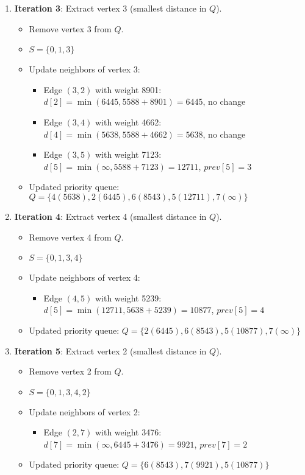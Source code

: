 \documentclass{article}
\theoremstyle{definition}
\begin{document}
\begin{enumerate}
\item \textbf{Iteration 3}: Extract vertex 3 (smallest distance in $Q$).
   \begin{itemize}
   \item Remove vertex 3 from $Q$.
   \item $S = \{0, 1, 3\}$
   \item Update neighbors of vertex 3:
     \begin{itemize}
     \item Edge $(3,2)$ with weight 8901: $d[2] = \min(6445, 5588 + 8901) = 6445$, no change
     \item Edge $(3,4)$ with weight 4662: $d[4] = \min(5638, 5588 + 4662) = 5638$, no change
     \item Edge $(3,5)$ with weight 7123: $d[5] = \min(\infty, 5588 + 7123) = 12711$, $prev[5] = 3$
     \end{itemize}
   \item Updated priority queue: $Q = \{4(5638), 2(6445), 6(8543), 5(12711), 7(\infty)\}$
   \end{itemize}

\item \textbf{Iteration 4}: Extract vertex 4 (smallest distance in $Q$).
   \begin{itemize}
   \item Remove vertex 4 from $Q$.
   \item $S = \{0, 1, 3, 4\}$
   \item Update neighbors of vertex 4:
     \begin{itemize}
     \item Edge $(4,5)$ with weight 5239: $d[5] = \min(12711, 5638 + 5239) = 10877$, $prev[5] = 4$
     \end{itemize}
   \item Updated priority queue: $Q = \{2(6445), 6(8543), 5(10877), 7(\infty)\}$
   \end{itemize}

\item \textbf{Iteration 5}: Extract vertex 2 (smallest distance in $Q$).
   \begin{itemize}
   \item Remove vertex 2 from $Q$.
   \item $S = \{0, 1, 3, 4, 2\}$
   \item Update neighbors of vertex 2:
     \begin{itemize}
     \item Edge $(2,7)$ with weight 3476: $d[7] = \min(\infty, 6445 + 3476) = 9921$, $prev[7] = 2$
     \end{itemize}
   \item Updated priority queue: $Q = \{6(8543), 7(9921), 5(10877)\}$
   \end{itemize}


\end{enumerate}
\end{document}
